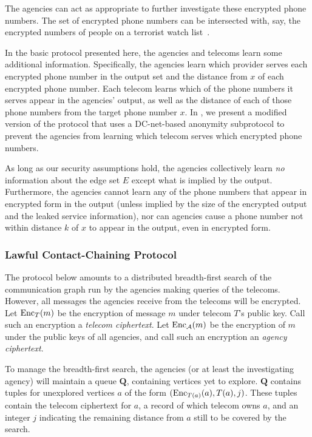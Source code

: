The agencies can act as
appropriate to further investigate these encrypted phone numbers.
The set of encrypted
phone numbers can be intersected with, say, the encrypted numbers of people on
a terrorist
watch list~\cite{sff-foci2014}.

In the basic protocol presented here, the agencies and telecoms learn some additional information. Specifically, the agencies learn which provider serves each encrypted phone number in the output set and the distance from $x$ of each encrypted phone number. Each telecom learns which of the phone numbers it serves appear in the agencies' output, as well as the distance of each of those phone numbers from the target phone number $x$.
In \cite[Section 4.1.5]{sff-TR}, we present a modified version of the protocol that uses a DC-net-based anonymity subprotocol to prevent the agencies from learning which telecom serves which encrypted phone numbers.

As long as our security assumptions hold, the agencies collectively learn \emph{no} information about the edge set $E$ except what is implied by the output. Furthermore, the agencies cannot learn any of the phone numbers that appear in encrypted form in the output (unless implied by the size of the encrypted output and the leaked service information), nor can agencies cause a phone number not within distance $k$ of $x$ to appear in the output, even in encrypted form.

\subsubsection{Lawful Contact-Chaining Protocol}

\label{sec-proto1}

The protocol below amounts to a distributed breadth-first search of the communication graph run by the agencies making queries of the telecoms. However, all messages the agencies receive from the telecoms will be encrypted. 
Let $\operatorname{Enc}_T(m)$ be the encryption of message $m$ under telecom $T$'s public key. Call such an encryption a \emph{telecom ciphertext}. Let $\operatorname{Enc}_\mathcal{A}(m)$ be the encryption of $m$ under the public keys of all agencies, and call such an encryption an \emph{agency ciphertext}.

To manage the breadth-first search, the agencies (or at least the investigating agency) will maintain a queue $\mathbf{Q}$, containing vertices yet to explore. $\mathbf{Q}$ contains tuples for unexplored vertices $a$ of the form $(\operatorname{Enc}_{T(a)}(a), T(a), j)$. These tuples contain the telecom ciphertext for $a$, a record of which telecom owns $a$, and an integer $j$ indicating the remaining distance from $a$ still to be covered by the search.


